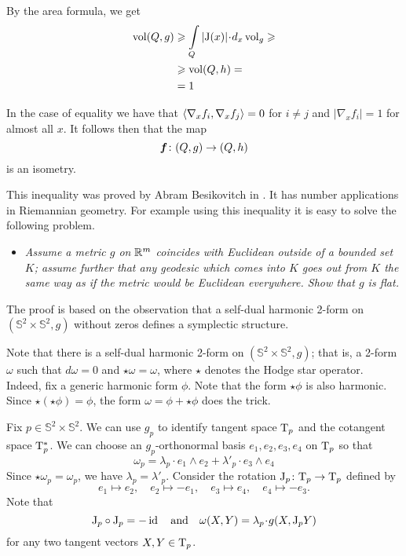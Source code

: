 By the area formula, we get 
\begin{align*}
\vol(Q,g)
&\ge \int\limits_Q|\mathrm{J}(x)|\cdot d_x\vol_g\ge
\\
&\ge\vol(Q,h)=\\
&=1
\end{align*}

In the case of equality we have that $\langle\nabla_x f_i,\nabla_x f_j\rangle=0$ for $i\ne j$ 
and $|\nabla_x f_i|=1$ for almost all $x$.
It follows then that the map 
\[\bm{f}\:(Q,g)\z\to (Q,h)\] 
is an isometry.
\qeds

This inequality was proved by Abram Besikovitch in \cite{besicovitch}.
It has number applications in Riemannian geometry.
For example using this inequality it is easy to solve the following problem.
\begin{itemize}
\item {\it Assume a metric $g$ on $\mathbb{R}^m$ coincides with Euclidean outside of a bounded set $K$;
assume further that any geodesic which comes into $K$ goes out from $K$ the same way as if the metric would be Euclidean everywhere. 
Show that $g$ is flat.}
\end{itemize}


The proof is based on the observation that a self-dual harmonic 2-form on $(\mathbb{S}^2\times\mathbb{S}^2,g)$
without zeros defines a symplectic structure.

\medskip

Note that there is a self-dual harmonic 2-form on $(\mathbb{S}^2\times\mathbb{S}^2,g)$;
that is, a 2-form $\omega$ such that $d\omega=0$ and $\star\omega=\omega$,
where $\star$ denotes the Hodge star operator.
Indeed, fix a generic harmonic form $\phi$.
Note that the form $\star\phi$ is also harmonic.
Since $\star(\star\phi)=\phi$,
the form $\omega=\phi+\star\phi$ does the trick.

Fix $p\in \mathbb{S}^2\times\mathbb{S}^2$.
We can use $g_p$ to identify tangent space $\mathrm{T}_p$ and the cotangent space $\mathrm{T}^*_p$.
We can choose an $g_p$-orthonormal basis $e_1, e_2, e_3, e_4$ on $\mathrm{T}_p$ so that 
\[\omega_p=\lambda_p\cdot e_1\wedge e_2+\lambda'_p\cdot  e_3\wedge e_4\]
Since $\star\omega_p=\omega_p$, we have $\lambda_p=\lambda'_p$.
Consider the rotation $\mathrm{J}_p\colon\mathrm{T}_p\to\mathrm{T}_p$ defined by 
\[ 
e_1\mapsto e_2,
\quad 
e_2\mapsto -e_1,
\quad 
e_3\mapsto e_4,
\quad 
e_4\mapsto-e_3.\]
Note that
\[\mathrm{J}_p\circ\mathrm{J}_p =-\id
\quad\text{and}\quad
\omega(X,Y)=\lambda_p\cdot g(X,\mathrm{J}_pY)\] 
for any two tangent vectors $X,Y\in \mathrm{T}_p$.

